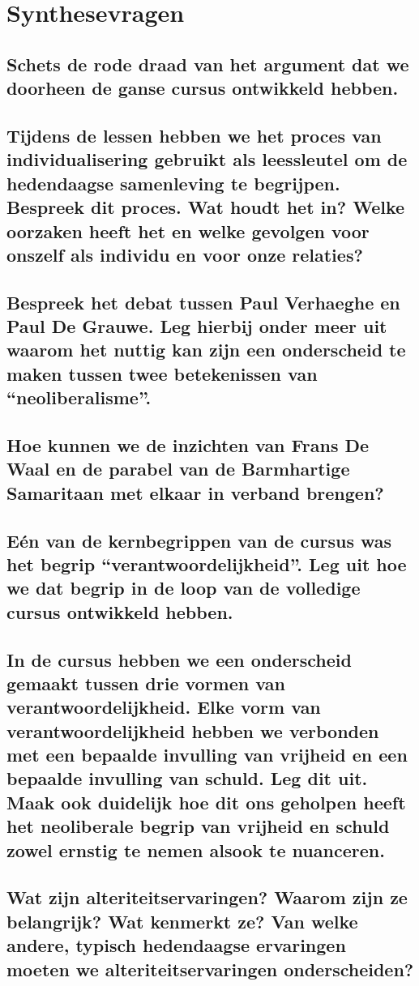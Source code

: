 \documentclass[main.tex]{subfiles}
\begin{document}
\section{Synthesevragen}
\subsection{Schets de rode draad van het argument dat we doorheen de ganse cursus ontwikkeld hebben.}
\subsection{Tijdens de lessen hebben we het proces van individualisering gebruikt als leessleutel om de hedendaagse samenleving te begrijpen. Bespreek dit proces. Wat houdt het in? Welke oorzaken heeft het en welke gevolgen voor onszelf als individu en voor onze relaties?}
\subsection{Bespreek het debat tussen Paul Verhaeghe en Paul De Grauwe. Leg hierbij onder meer uit waarom het nuttig kan zijn een onderscheid te maken tussen twee betekenissen van “neoliberalisme”.}
\subsection{Hoe kunnen we de inzichten van Frans De Waal en de parabel van de Barmhartige Samaritaan met elkaar in verband brengen?}
\subsection{Eén van de kernbegrippen van de cursus was het begrip “verantwoordelijkheid”. Leg uit hoe we dat begrip in de loop van de volledige cursus ontwikkeld hebben.}
\subsection{In de cursus hebben we een onderscheid gemaakt tussen drie vormen van verantwoordelijkheid. Elke vorm van verantwoordelijkheid hebben we verbonden met een bepaalde invulling van vrijheid en een bepaalde invulling van schuld. Leg dit uit. Maak ook duidelijk hoe dit ons geholpen heeft het neoliberale begrip van vrijheid en schuld zowel ernstig te nemen alsook te nuanceren.}
\subsection{Wat zijn alteriteitservaringen? Waarom zijn ze belangrijk? Wat kenmerkt ze? Van welke andere, typisch hedendaagse ervaringen moeten we alteriteitservaringen onderscheiden?}
\end{document}
